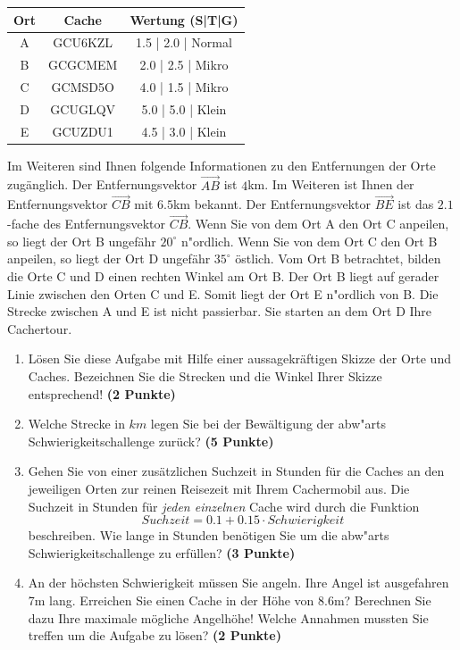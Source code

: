 \documentclass[a4paper, 9pt]{scrartcl}\usepackage[]{graphicx}\usepackage[]{xcolor}
\begin{document}
\begin{center}
  \begin{tabular}{ ccc }
    \toprule
    Ort & Cache & Wertung (S|T|G) \\
    \midrule
    A & GCU6KZL & 1.5 | 2.0 | Normal \\
    B & GCGCMEM & 2.0 | 2.5 | Mikro \\ 
    C & GCMSD5O & 4.0 | 1.5 | Mikro \\ 
    D & GCUGLQV & 5.0 | 5.0 | Klein \\ 
    E & GCUZDU1 & 4.5 | 3.0 | Klein \\     
 \bottomrule
\end{tabular}
\end{center}

Im Weiteren sind Ihnen folgende Informationen zu den Entfernungen der Orte
zug{\"a}nglich. Der Entfernungsvektor $\overrightarrow{AB}$ ist
$4$km. Im Weiteren ist Ihnen der Entfernungsvektor
$\overrightarrow{CB}$ mit $6.5$km bekannt. Der
Entfernungsvektor $\overrightarrow{BE}$ ist das $2.1$-fache
des Entfernungsvektor $\overrightarrow{CB}$. Wenn Sie von dem Ort A den Ort
C anpeilen, so liegt der Ort B ungef{\"a}hr $20^\circ$
n{"o}rdlich. Wenn Sie von dem Ort C den Ort B anpeilen, so liegt
der Ort D ungef{\"a}hr $35^\circ$ {\"o}stlich. Vom Ort B
betrachtet, bilden die Orte C und D einen rechten Winkel am Ort B. Der Ort
B liegt auf gerader Linie zwischen den Orten C und E. Somit liegt der Ort E
n{"o}rdlich von B. Die Strecke zwischen A und E ist nicht
passierbar. Sie starten an dem Ort D Ihre Cachertour. \\

\begin{enumerate}
\item L{\"o}sen Sie diese Aufgabe mit Hilfe einer aussagekr{\"a}ftigen Skizze der
  Orte und Caches. Bezeichnen Sie die Strecken und die Winkel Ihrer Skizze
  entsprechend! \textbf{(2 Punkte)}
\item Welche Strecke in $km$ legen Sie bei der Bew{\"a}ltigung der
  abw{"a}rts Schwierigkeitschallenge zur{\"u}ck? \textbf{(5
    Punkte)}
\item Gehen Sie von einer zus{\"a}tzlichen Suchzeit in Stunden f{\"u}r die
  Caches an den jeweiligen Orten zur reinen Reisezeit mit Ihrem Cachermobil
  aus. Die Suchzeit in Stunden f{\"u}r \textit{jeden einzelnen} Cache wird durch die
  Funktion
  \begin{equation*}
    Suchzeit = 0.1 + 0.15 \cdot Schwierigkeit
  \end{equation*}  
  beschreiben.  Wie lange in Stunden ben{\"o}tigen Sie um die
  abw{"a}rts Schwierigkeitschallenge zu erf{\"u}llen? \textbf{(3 Punkte)}
\item An der h{\"o}chsten Schwierigkeit m{\"u}ssen Sie angeln. Ihre Angel ist
  ausgefahren 7m lang. Erreichen Sie einen Cache in der H{\"o}he
  von 8.6m?  Berechnen Sie dazu Ihre maximale m{\"o}gliche
  Angelh{\"o}he! Welche Annahmen mussten Sie treffen um die Aufgabe zu l{\"o}sen? \textbf{(2 Punkte)} 
\end{enumerate}
\end{document}
